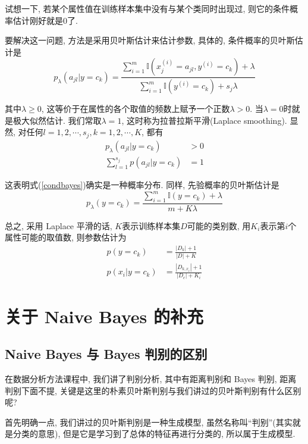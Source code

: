 \documentclass[a4paper,UTF8]{ctexart}
\theoremstyle{plain} \newtheorem{theorem}{定理}[section]
\theoremstyle{plain} \newtheorem{definition}{定义}[section]
\theoremstyle{plain} \newtheorem{lemma}{引理}[section]
\theoremstyle{plain} \newtheorem{proposition}{命题}[section]
\theoremstyle{plain} \newtheorem{example}{例}[section]
\theoremstyle{plain} \newtheorem{remark}{注}[section]
\theoremstyle{plain} \newtheorem{corollary}{推论}[section]
\begin{document}
试想一下, 若某个属性值在训练样本集中没有与某个类同时出现过, 则它的条件概率估计刚好就是$0$了.

要解决这一问题, 方法是采用贝叶斯估计来估计参数, 具体的, 条件概率的贝叶斯估计是
\begin{equation}\label{condbayes}
p_{\lambda} (a_{jl} | y = c_k) = \frac{\sum_{i=1}^{m} \mathbb{I}(x_{j}^{(i)} = a_{jl}, y^{(i)} = c_k) + \lambda}{\sum_{i=1}^{m} \mathbb{I}(y^{(i)} = c_k) + s_{j} \lambda}
\end{equation}

其中$\lambda \geqslant 0$, 这等价于在属性的各个取值的频数上赋予一个正数$\lambda > 0$. 当$\lambda = 0$时就是极大似然估计. 我们常取$\lambda = 1$, 这时称为拉普拉斯平滑(Laplace smoothing). 显然, 对任何$l = 1,2,\cdots, s_{j}, k = 1,2,\cdots,K$, 都有
\begin{align*}
p_{\lambda} (a_{jl} | y = c_k) & > 0 \\ 
\sum_{l=1}^{s_{j}} p(a_{jl} | y = c_k) & = 1
\end{align*}

这表明式(\ref{condbayes})确实是一种概率分布. 同样, 先验概率的贝叶斯估计是
\begin{equation*}
p_{\lambda} (y = c_k) = \frac{\sum_{i=1}^{m} \mathbb{I}(y = c_k) + \lambda}{m + K \lambda}
\end{equation*}

总之, 采用 Laplace 平滑的话, $K$表示训练样本集$D$可能的类别数, 用$K_i$表示第$i$个属性可能的取值数, 则参数估计为
\begin{align*}
p(y = c_k) & = \frac{|D_k| + 1}{|D| + K} \\ 
p(x_i | y = c_k) & = \frac{|D_{k,x_i}| + 1}{|D_c| + K_i}
\end{align*}




\section{关于 Naive Bayes 的补充}
\subsection{Naive Bayes 与 Bayes 判别的区别}
在数据分析方法课程中, 我们讲了判别分析, 其中有距离判别和 Bayes 判别, 距离判别下面不提, 关键是这里的朴素贝叶斯判别与我们讲过的贝叶斯判别有什么区别呢?

首先明确一点, 我们讲过的贝叶斯判别是一种生成模型, 虽然名称叫“判别”(其实就是分类的意思), 但是它是学习到了总体的特征再进行分类的, 所以属于生成模型.
\end{document}
